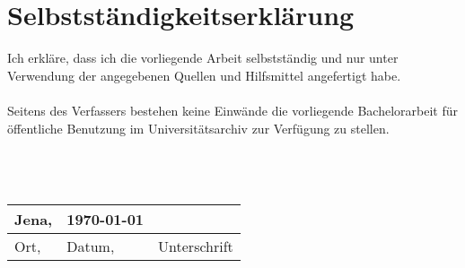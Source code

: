 \chapter*{Selbstständigkeitserklärung}
\thispagestyle{empty}
Ich erkläre, dass ich die vorliegende Arbeit selbstständig und nur unter Verwendung der angegebenen Quellen und Hilfsmittel angefertigt habe.\\
\ \\
Seitens des Verfassers bestehen keine Einwände die vorliegende Bachelorarbeit für öffentliche Benutzung im Universitätsarchiv zur Verfügung zu stellen.\\
\ \\
\ \\
\ \\
\begin{tabular}{lll}
	Jena,	& \today	&\\
	\hline
	Ort,	& Datum,	& Unterschrift\\
\end{tabular}